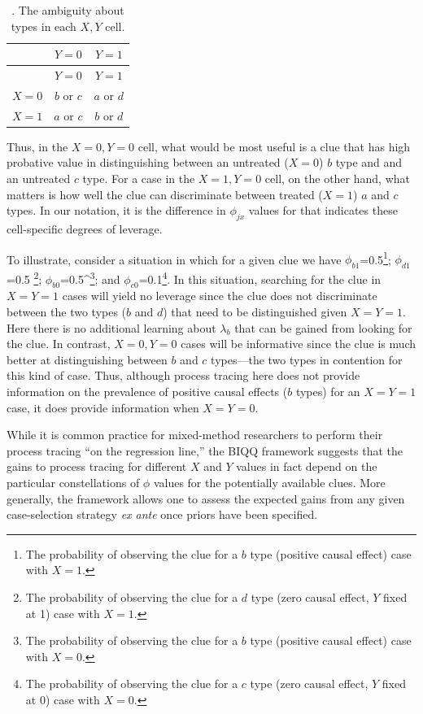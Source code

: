 \documentclass[12pt,]{book}
\let\rmarkdownfootnote\footnote%
\def\footnote{\protect\rmarkdownfootnote}
\begin{document}
\begin{longtable}[]{@{}lcc@{}}
\caption{\label{tab:FP}. The ambiguity about types in each \(X, Y\) cell.}\tabularnewline
\toprule
\small & \(Y=0\) & \(Y=1\)\tabularnewline
\midrule
\endfirsthead
\toprule
\small & \(Y=0\) & \(Y=1\)\tabularnewline
\midrule
\endhead
\(X=0\) & \(b\) or \(c\) & \(a\) or \(d\)\tabularnewline
\(X=1\) & \(a\) or \(c\) & \(b\) or \(d\)\tabularnewline
\bottomrule
\end{longtable}

Thus, in the \(X=0, Y=0\) cell, what would be most useful is a clue that has high probative value in distinguishing between an untreated (\(X=0\)) \(b\) type and and an untreated \(c\) type. For a case in the \(X=1, Y=0\) cell, on the other hand, what matters is how well the clue can discriminate between treated (\(X=1\)) \(a\) and \(c\) types. In our notation, it is the difference in \(\phi_{jx}\) values for that indicates these cell-specific degrees of leverage.

To illustrate, consider a situation in which for a given clue we have \(\phi_{b1}\)=0.5\footnote{The probability of observing the clue for a \(b\) type (positive causal effect) case with \(X=1\).}; \(\phi_{d1}\)=0.5 \footnote{The probability of observing the clue for a \(d\) type (zero causal effect, \(Y\) fixed at 1) case with \(X=1\).}; \(\phi_{b0}\)=0.5\^{}\footnote{The probability of observing the clue for a \(b\) type (positive causal effect) case with \(X=0\).}; and \(\phi_{c0}\)=0.1\footnote{The probability of observing the clue for a \(c\) type (zero causal effect, \(Y\) fixed at 0) case with \(X=0\).}. In this situation, searching for the clue in \(X=Y=1\) cases will yield no leverage since the clue does not discriminate between the two types (\(b\) and \(d\)) that need to be distinguished given \(X=Y=1\). Here there is no additional learning about \(\lambda_b\) that can be gained from looking for the clue. In contrast, \(X=0, Y=0\) cases will be informative since the clue is much better at distinguishing between \(b\) and \(c\) types---the two types in contention for this kind of case. Thus, although process tracing here does not provide information on the prevalence of positive causal effects (\(b\) types) for an \(X=Y=1\) case, it does provide information when \(X=Y=0\).

While it is common practice for mixed-method researchers to perform their process tracing ``on the regression line,'' the BIQQ framework suggests that the gains to process tracing for different \(X\) and \(Y\) values in fact depend on the particular constellations of \(\phi\) values for the potentially available clues. More generally, the framework allows one to assess the expected gains from any given case-selection strategy \emph{ex ante} once priors have been specified.
\end{document}
